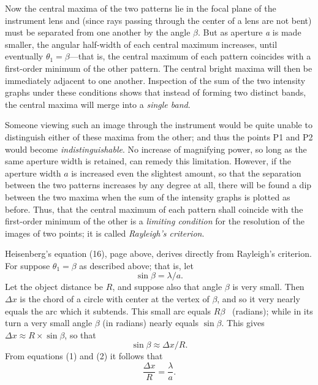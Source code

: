 Now the central maxima of the two patterns lie in the focal plane of the
instrument lens and (since rays passing through the center of a lens are
not bent) must be separated from one another by the angle $\beta$. But
as aperture \emph{a} is made smaller, the angular half-width of each
central maximum increases, until eventually $\theta_1 = \beta$---that
is, the central maximum of each pattern coincides with a first-order
minimum of the other pattern. The central bright maxima will then be
immediately adjacent to one another. Inspection of the sum of the two
intensity graphs under these conditions shows that instead of forming
two distinct bands, the central maxima will merge into a \emph{single
band}.

Someone viewing such an image through the instrument would be quite
unable to distinguish either of these maxima from the other; and thus
the points P1 and P2 would become \emph{indistinguishable}. No increase
of magnifying power, so long as the same aperture width is retained, can
remedy this limitation. However, if the aperture width $a$ is
increased even the slightest amount, so that the separation between the
two patterns increases by any degree at all, there will be found a dip
between the two maxima when the sum of the intensity graphs is plotted
as before. Thus, that the central maximum of each pattern shall coincide
with the first-order minimum of the other is a \emph{limiting condition}
for the resolution of the images of two points; it is called
\emph{Rayleigh's criterion}.

Heisenberg's equation (16), page \pageref{eq:heis16} above, derives directly from
Rayleigh's criterion.\label{p:heis16} For suppose $\theta_1 = \beta$ as described
above; that is, let
%
\begin{equation}
\sin \beta = \lambda/a. %
\end{equation}
%
Let the object distance be $R$, and suppose also that angle
$\beta$ is very small. Then $\Delta x$ is the chord of a circle with
center at the vertex of $\beta$, and so it very nearly equals the arc
which it subtends. This small arc equals $R\beta$ \ (radians);
while in its turn a very small angle $\beta$ (in radians) nearly equals
$\sin \beta$. This gives $\Delta x \approx R \times \sin\beta$, so that
%
\begin{equation}
\sin \beta \approx \Delta x/R . %
\end{equation}
%
From equations (1) and (2) it follows that
%
\begin{equation}
\frac{\Delta x}{R} = \frac{\lambda}{a}. %
\end{equation}
%

